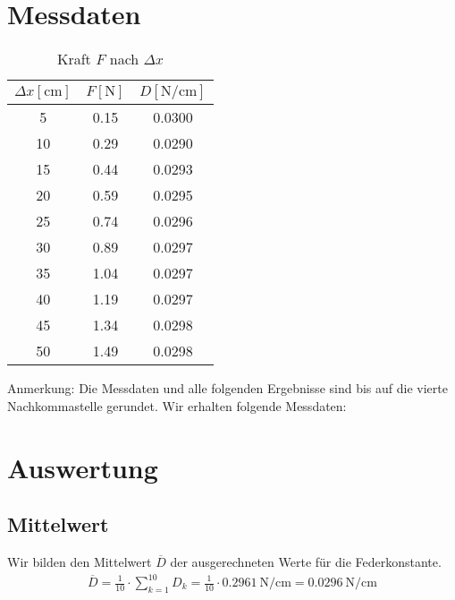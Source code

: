 \section{Messdaten}
\begin{table}
    \centering
    \caption{Kraft $ F $ nach $ \Delta x $ }
    \begin{tabular}{S S S}
        \toprule
        {$ \Delta x  [\unit{\cm}]$}  & {$ F [\unit{\newton}]  $}   & {$ D  [\unit{\newton\per\cm}] $} \\
        \midrule
        5             &  0.15      & 0.0300 \\
        10            &  0.29      & 0.0290 \\
        15            &  0.44      & 0.0293 \\
        20            &  0.59      & 0.0295 \\
        25            &  0.74      & 0.0296 \\
        30            &  0.89      & 0.0297 \\
        35            &  1.04      & 0.0297 \\
        40            &  1.19      & 0.0297 \\
        45            &  1.34      & 0.0298 \\
        50            &  1.49      & 0.0298 \\
        

    \end{tabular}
\end{table}

Anmerkung: Die Messdaten und alle folgenden Ergebnisse sind bis auf die vierte Nachkommastelle gerundet.
Wir erhalten folgende Messdaten:

\section{Auswertung}
\subsection{Mittelwert}
Wir bilden den Mittelwert $\overline{D}$ der ausgerechneten Werte für die Federkonstante.
\begin{align}
    \overline{D} =\frac{1}{10} \cdot \sum_{k=1}^{10} D_k = \frac{1}{10} \cdot \qty{0.2961}{\newton\per\cm} = \qty{0.0296}{\newton\per\cm}
\end{align}

